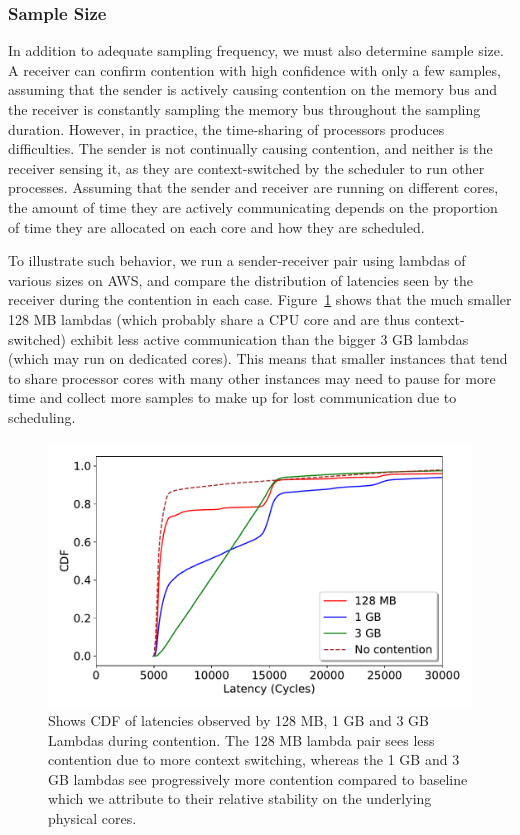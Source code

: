 \subsubsection{Sample Size} 
\label{sec:method:samplingdur}
In addition to adequate sampling frequency, we must also determine sample size.  
A receiver can confirm contention with high confidence with only a
few samples, assuming that the sender is actively causing contention on the
memory bus and the receiver is constantly sampling the memory bus throughout the
sampling duration. However, in practice, the time-sharing of processors
produces difficulties. The sender is not continually causing contention, and
neither is the receiver sensing it, as they are context-switched by the
scheduler to run other processes.  Assuming that the sender and receiver are
running on different cores, the amount of time they are actively communicating
depends on the proportion of time they are allocated on each core and how they
are scheduled. 

To illustrate such behavior, we run a sender-receiver pair using
lambdas\cite{awslambda} of various sizes on AWS, and compare the distribution of
latencies seen by the receiver during the contention in each case.
Figure~\ref{fig:context_switching} shows that the much smaller 128 MB lambdas
(which probably share a CPU core and are thus context-switched) exhibit less
active communication than the bigger 3 GB lambdas (which may run on dedicated
cores).  This means that smaller instances that tend to share processor cores
with many other instances may need to pause for more time and collect more
samples to make up for lost communication due to scheduling.


\begin{figure}[!t]
  \includegraphics[width=.99\linewidth]{fig/lambda_sched_effect.pdf}
  \caption{Shows CDF of latencies observed by 128 MB, 1 GB and 3 GB Lambdas during 
  contention. The 128 MB lambda pair sees less contention due to more context switching, 
  whereas the 1 GB and 3 GB lambdas see progressively more contention compared to baseline 
  which we attribute to their relative stability on the underlying physical cores. 
\label{fig:context_switching}}
\end{figure}

